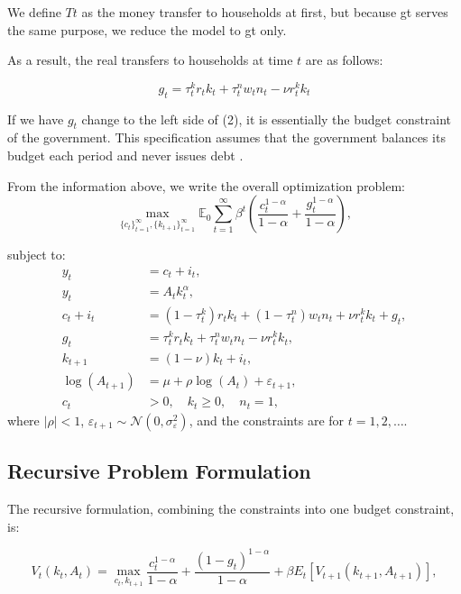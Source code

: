 \documentclass{article}
\begin{document}
We define \( Tt \) as the money transfer to households at first, but because gt serves the same purpose, we reduce the model to gt only.

As a result, the real transfers to households at time \( t \) are as follows:

\begin{equation}
    g_t = \tau_t^k r_t k_t + \tau_t^n w_t n_t - \nu r_t^k k_t 
\end{equation}

If we have \( g_t \) change to the left side of (2), it is essentially the budget constraint of the government. This specification assumes that the government balances its budget each period and never issues debt \cite{McGrattan1994}.

From the information above, we write the overall optimization problem:
\begin{equation}
    \max_{\{c_t\}_{t=1}^{\infty}, \{k_{t+1}\}_{t=1}^{\infty}} 
    \mathbb{E}_0 \sum_{t=1}^{\infty} \beta^t \left( \frac{c_t^{1-\alpha}}{1-\alpha} + \frac{g_t^{1-\alpha}}{1-\alpha} \right),
\end{equation}

subject to:
\begin{align}
    y_t &= c_t + i_t, \\
    y_t &= A_t k_t^\alpha, \\
    c_t + i_t &= \left( 1 - \tau_t^k \right) r_t k_t + \left( 1 - \tau_t^n \right) w_t n_t + \nu r_t^k k_t + g_t, \\
    g_t &= \tau_t^k r_t k_t + \tau_t^n w_t n_t - \nu r_t^k k_t, \\
    k_{t+1} &= (1 - \nu) k_t + i_t, \\
    \log(A_{t+1}) &= \mu + \rho \log(A_t) + \varepsilon_{t+1}, \\
    c_t &> 0, \quad k_t \geq 0, \quad n_t = 1,
\end{align}
where \( |\rho| < 1 \), \( \varepsilon_{t+1} \sim \mathcal{N}(0, \sigma_\varepsilon^2) \), and the constraints are for \( t = 1,2,\dots \).

\subsection*{Recursive Problem Formulation}

The recursive formulation, combining the constraints into one budget constraint, is:

\[
V_t(k_t, A_t) = \max_{c_t, k_{t+1}} \frac{c_t^{1-\alpha}}{1-\alpha} + \frac{(1 - g_t)^{1-\alpha}}{1-\alpha} + \beta E_t \left[ V_{t+1}(k_{t+1}, A_{t+1}) \right],
\]
\end{document}

